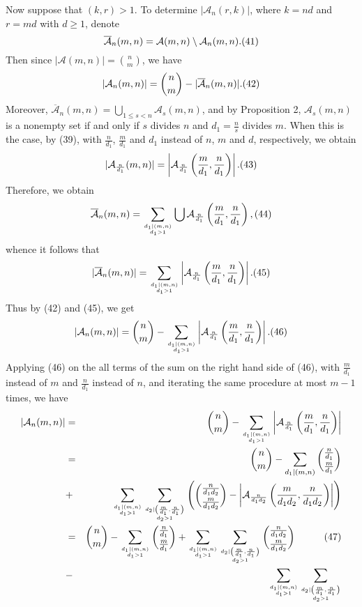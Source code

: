 \documentclass[12pt]{amsart}
\begin{document}
{Now suppose that $(k,r)>1$. To determine $|{\mathcal A}_n(r,k)|$,
where $k=nd$ and $r=md$ with $d\ge 1$, denote
   $$
\overline{{\mathcal A}}_n(m,n)={\mathcal A}(m,n)\setminus {\mathcal A}_n(m,n).
\relax(41)
   $$
Then since $|{\mathcal A}(m,n)|={n \choose m}$, we have
   $$
|{\mathcal A}_n(m,n)|={n \choose m} -|\overline{{\mathcal A}}_n(m,n)|.
\relax(42)
   $$
Moreover, $\overline{{\mathcal A}}_n(m,n)=\bigcup_{1\le s<n}{\mathcal A}_s(m,n)$,
and by Proposition 2, ${\mathcal A}_s(m,n)$ is a  nonempty set
 if and only if $s$ divides $n$ and
$d_1=\frac{n}{s}$ divides $m$. When this is the case, by (39),
with $\frac{n}{d_1}$, $\frac{m}{d_1}$ and $d_1$ instead of
$n$, $m$ and $d$, respectively, we obtain
   $$
|{\mathcal A}_{\frac{n}{d_1}}(m,n)|=\left|{\mathcal A}_{\frac{n}{d_1}}\left(\frac{m}{d_1},
\frac{n}{d_1}\right)\right|.\relax(43)
 $$
Therefore, we obtain
 $$
\overline{{\mathcal A}}_n(m,n)=\sum_{d_1|(m,n)
\atop d_1>1}\bigcup{\mathcal A}_{\frac{n}{d_1}}
\left(\frac{m}{d_1},\frac{n}{d_1}\right),\relax(44) 
  $$
whence it follows that
    $$
|\overline{{\mathcal A}}_n(m,n)|=\sum_{d_1|(m,n)
\atop d_1>1}\left|{\mathcal A}_{\frac{n}{d_1}}
\left(\frac{m}{d_1},\frac{n}{d_1}\right)\right|.\relax(45)
 $$
Thus by  (42) and (45), we get
$$
|{\mathcal A}_n(m,n)|={n \choose m}-\sum_{d_1|(m,n)\atop d_1>1}\left|
{\mathcal A}_{\frac{n}{d_1}}\left(\frac{m}{d_1},\frac{n}{d_1}\right)\right|.
\relax(46)
 $$
Applying (46) on the all terms of the sum on the right hand side of (46),
 with $\frac{m}{d_1}$ instead 
of $m$ and $\frac{n}{d_1}$ instead of $n$, 
and iterating the same procedure at most $m-1$ times, we have
  \begin{eqnarray*} 
|{\mathcal A}_n(m,n)| &=&{n \choose m}-\sum_{d_1|(m,n)\atop d_1>1}\left|
{\mathcal A}_{\frac{n}{d_1}}\left(\frac{m}{d_1},\frac{n}{d_1}\right)\right|\\
&=&{n \choose m}- \sum_{d_1|(m,n)}{\frac{n}{d_1}\choose\frac{m}{d_1}}\\
&+&\sum_{d_1|(m,n)\atop d_1>1}\sum_{d_2|\left(\frac{m}{d_1},
\frac{n}{d_1}\right)\atop d_2>1}\left({\frac{n}{d_1d_2}\choose\frac{m}{d_1d_2}}
-\left|{{\mathcal A}}_{\frac{n}{d_1d_2}}\left(\frac{m}{d_1d_2},
\frac{n}{d_1d_2}\right)\right|\right)\\
 &=&{n \choose m}- \sum_{d_1|(m,n)\atop d_1>1}{\frac{n}{d_1}
\choose\frac{m}{d_1}}
+\sum_{d_1|(m,n)\atop d_1>1}\sum_{d_2|\left(\frac{m}{d_1},
\frac{n}{d_1}\right)\atop d_2>1}
 {\frac{n}{d_1d_2}\choose\frac{m}{d_1d_2}}\qquad\quad(47)\\
&-&\sum_{d_1|(m,n)\atop d_1>1}
\sum_{d_2|\left(\frac{m}{d_1},\frac{n}{d_1}\right)\atop d_2>1}

\end{eqnarray*}}
\end{document}
